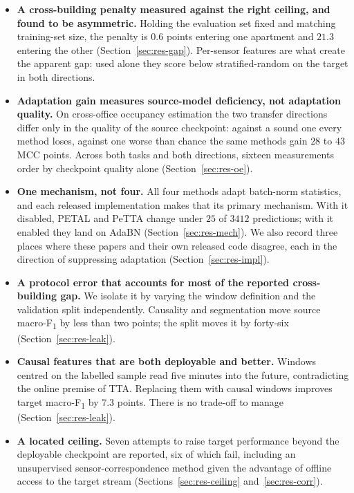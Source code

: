 \documentclass[a4paper,fleqn]{cas-dc}
\newcommand{\macf}{macro-F\textsubscript{1}}
\begin{document}
\begin{itemize}
\item \textbf{A cross-building penalty measured against the right ceiling, and found to
  be asymmetric.} Holding the evaluation set fixed and matching training-set size, the
  penalty is $0.6$ points entering one apartment and $21.3$ entering the other
  (Section~\ref{sec:res-gap}). Per-sensor features are what create the apparent gap:
  used alone they score below stratified-random on the target in both directions.

\item \textbf{Adaptation gain measures source-model deficiency, not adaptation quality.} On cross-office
  occupancy estimation the two transfer directions differ only in the quality of the
  source checkpoint: against a sound one every method loses, against one worse than chance
  the same methods gain $28$ to $43$ MCC points. Across both tasks and both directions,
  sixteen measurements order by checkpoint quality alone (Section~\ref{sec:res-oe}).

\item \textbf{One mechanism, not four.} All four methods adapt batch-norm statistics, and
  each released implementation makes that its primary mechanism. With it disabled, PETAL
  and PeTTA change under $25$ of $3412$ predictions; with it enabled they land on AdaBN
  (Section~\ref{sec:res-mech}). We also record three places where these papers and their
  own released code disagree, each in the direction of suppressing adaptation
  (Section~\ref{sec:res-impl}).

\item \textbf{A protocol error that accounts for most of the reported cross-building gap.}
  We isolate it by varying the window definition and the validation split independently.
  Causality and segmentation move source \macf{} by less than two points; the split moves
  it by forty-six (Section~\ref{sec:res-leak}).

\item \textbf{Causal features that are both deployable and better.} Windows centred on the
  labelled sample read five minutes into the future, contradicting the online premise of
  TTA. Replacing them with causal windows improves target \macf{} by $7.3$ points. There
  is no trade-off to manage (Section~\ref{sec:res-leak}).

\item \textbf{A located ceiling.} Seven attempts to raise target performance beyond the
  deployable checkpoint are reported, six of which fail, including an unsupervised
  sensor-correspondence method given the advantage of offline access to the target
  stream (Sections~\ref{sec:res-ceiling} and~\ref{sec:res-corr}).
\end{itemize}
\end{document}
